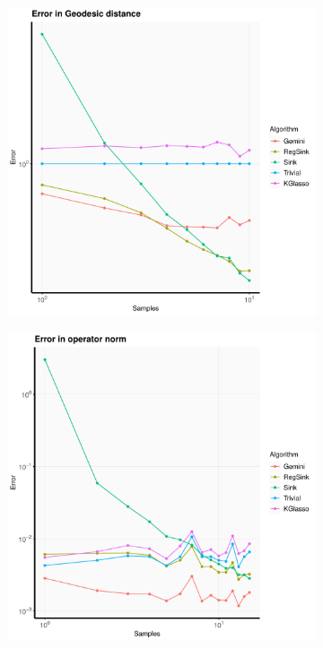 \documentclass[aos]{imsart}
\theoremstyle{definition}
\numberwithin{equation}{section}
\begin{document}
\begin{figure}
     \centering
     \begin{subfigure}[b]{0.3\textwidth}
         \centering
         \includegraphics[width=\textwidth]{./code/zhou-comparison/20-50-lc-geo.pdf}
     \end{subfigure}
     \hfill
     \begin{subfigure}[b]{0.3\textwidth}
         \centering
         \includegraphics[width=\textwidth]{./code/zhou-comparison/25-50-lc-op.pdf}

\end{subfigure}
\end{figure}
\end{document}
